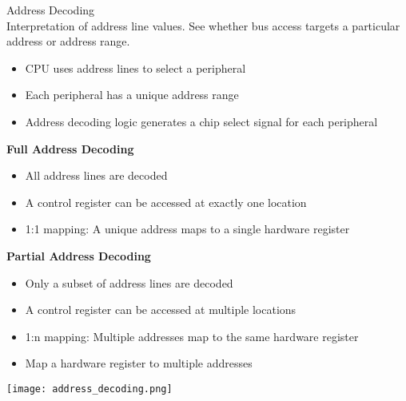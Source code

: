 \begin{definition}{Address Decoding}\\
    Interpretation of address line values. See whether bus access targets a particular address or address range.
    \begin{itemize}
        \item CPU uses address lines to select a peripheral
        \item Each peripheral has a unique address range
        \item Address decoding logic generates a chip select signal for each peripheral
    \end{itemize}

    \textbf{Full Address Decoding}
    \begin{itemize}
        \item All address lines are decoded
        \item A control register can be accessed at exactly one location
        \item 1:1 mapping: A unique address maps to a single hardware register
    \end{itemize}

    \textbf{Partial Address Decoding}
    \begin{itemize}
        \item Only a subset of address lines are decoded
        \item A control register can be accessed at multiple locations
        \item 1:n mapping: Multiple addresses map to the same hardware register
        \item Map a hardware register to multiple addresses
    \end{itemize}
    \texttt{[image: address\_decoding.png]}
\end{definition}